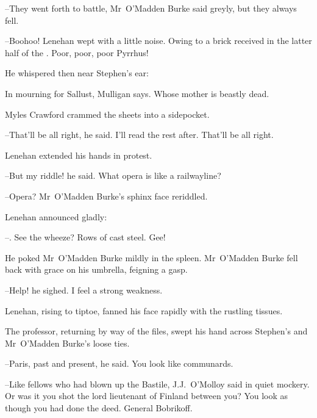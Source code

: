 --They went forth to battle,
Mr~O'Madden Burke said greyly,
but they always fell.

--Boohoo!
Lenehan wept with a little noise.
Owing to a brick received in the latter half of the .
Poor, poor, poor Pyrrhus!

He whispered then near Stephen's ear:




In mourning for Sallust,
Mulligan says.
Whose mother is beastly dead.

Myles Crawford crammed the sheets into a sidepocket.

--That'll be all right,
he said.
I'll read the rest after.
That'll be all right.

Lenehan extended his hands in protest.

--But my riddle!
he said.
What opera is like a railwayline?

--Opera?
Mr~O'Madden Burke's sphinx face reriddled.

Lenehan announced gladly:

--.
See the wheeze?
Rows of cast steel.
Gee!

He poked Mr~O'Madden Burke mildly in the spleen.
Mr~O'Madden Burke fell back with grace on his umbrella,
feigning a gasp.

--Help!
he sighed.
I feel a strong weakness.

Lenehan,
rising to tiptoe,
fanned his face rapidly with the rustling tissues.

The professor,
returning by way of the files,
swept his hand across Stephen's and Mr~O'Madden Burke's loose ties.

--Paris, past and present,
he said.
You look like communards.

--Like fellows who had blown up the Bastile,
J.J.~O'Molloy said in quiet mockery.
Or was it you shot the lord lieutenant of Finland between you?
You look as though you had done the deed.
General Bobrikoff.



